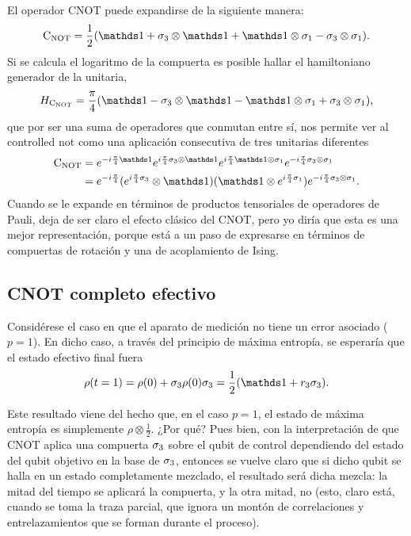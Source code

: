 El operador \textsc{CNOT} puede expandirse de la siguiente manera:
\begin{equation*}
        \cnot=\frac{1}{2}(\Id+\pauli{3}\otimes\Id+\Id\otimes\pauli{1}-\pauli{3}\otimes\pauli{1}).
\end{equation*}
Si se calcula el logaritmo de la compuerta es posible hallar el hamiltoniano generador de la unitaria,
\begin{equation*}
    H_{\cnot}=\frac{\pi}{4}\qty(\Id-\pauli{3}\otimes\Id-\Id\otimes\pauli{1}+\pauli{3}\otimes\pauli{1}),
\end{equation*}
que por ser una suma de operadores que conmutan entre sí, nos permite ver al controlled not como una aplicación consecutiva de tres unitarias diferentes
\begin{align*}
    \cnot&=e^{-i\frac{\pi}{4}\Id}e^{i\frac{\pi}{4}\pauli{3}\otimes\Id}e^{i\frac{\pi}{4}\Id\otimes\pauli{1}}e^{-i\frac{\pi}{4}\pauli{3}\otimes\pauli{1}}\\
    &=e^{-i\frac{\pi}{4}} (e^{i\frac{\pi}{4}\pauli{3}}\otimes \Id) (\Id \otimes e^{i\frac{\pi}{4}\pauli{1}}) e^{-i\frac{\pi}{4}\pauli{3}\otimes\pauli{1}}.
\end{align*}
Cuando se le expande en términos de productos tensoriales de operadores de Pauli, deja de ser claro el efecto clásico del CNOT, pero yo diría que esta es una mejor representación, porque está a un paso de expresarse en términos de compuertas de rotación y una de acoplamiento de Ising.
\subsection{CNOT completo efectivo}

Considérese el caso en que el aparato de medición no tiene un error asociado ($p=1$). En dicho caso, a través del principio de máxima entropía, se esperaría que el estado efectivo final fuera
\begin{equation*}
  \rho(t=1)=\rho(0)+\pauli{3}\rho(0)\pauli{3}=\frac{1}{2}(\Id+r_{3}\pauli{3}).
\end{equation*}


Este resultado viene del hecho que, en el caso $p=1$, el estado de máxima entropía es simplemente $\rho\otimes\frac{1}{2}$. ¿Por qué? Pues bien, con la interpretación de que CNOT aplica una compuerta $\sigma_{3}$ sobre el qubit de control dependiendo del estado del qubit objetivo en la base de $\sigma_{3}$, entonces se vuelve claro que si dicho qubit se halla en un estado completamente mezclado, el resultado será dicha mezcla: la mitad del tiempo se aplicará la compuerta, y la otra mitad, no (esto, claro está, cuando se toma la traza parcial, que ignora un montón de correlaciones y entrelazamientos que se forman durante el proceso).


